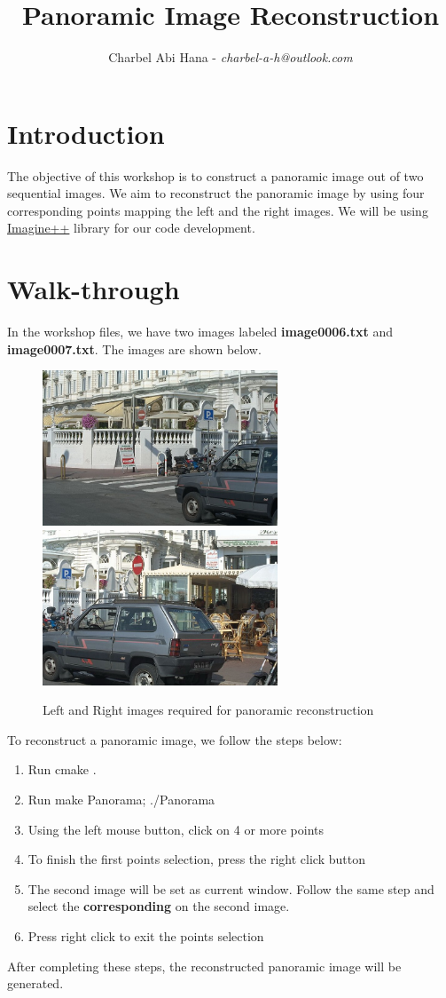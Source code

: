 \documentclass{article}
\title{Panoramic Image Reconstruction}
\author{Charbel Abi Hana - \textit{charbel-a-h@outlook.com}}
\begin{document}
\maketitle

\section{Introduction}

The objective of this workshop is to construct a panoramic image out of two sequential images. We aim to reconstruct the panoramic image by using four corresponding points mapping the left and the right images. We will be using \href{http://imagine.enpc.fr/~monasse/Imagine++/index.html}{Imagine++} library for our code development. 

\section{Walk-through}
In the workshop files, we have two images labeled \textbf{image0006.txt} and \textbf{image0007.txt}. The images are shown below.
\begin{figure}%
    \centering
    {\includegraphics[width=7cm]{image0006.jpg} }%
    \qquad
    {\includegraphics[width=7cm]{image0007.jpg} }%
    \caption{Left and Right images required for panoramic reconstruction}%
    \label{fig:example}%
\end{figure}

To reconstruct a panoramic image, we follow the steps below:
\begin{enumerate}
    \item Run cmake .
    \item Run make Panorama; ./Panorama
    \item Using the left mouse button, click on 4 or more points
    \item To finish the first points selection, press the right click button
    \item The second image will be set as current window. Follow the same step and select the  \textbf{corresponding} on the second image.
    \item Press right click to exit the points selection
\end{enumerate}
After completing these steps, the reconstructed panoramic image will be generated.
\end{document}
